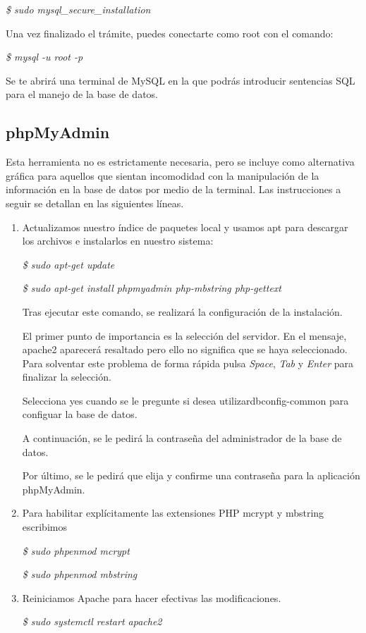 \documentclass[11pt,spanish,
		listoftables,listoffigures]
		{tfgplantilla}
\begin{document}
\textit {\$ sudo mysql\_secure\_installation}

Una vez finalizado el trámite, puedes conectarte como root con el comando:

\textit {\$ mysql -u root -p}

Se te abrirá una terminal de MySQL en la que podrás introducir sentencias SQL para el manejo de la base de datos. 

\subsection {phpMyAdmin}

Esta herramienta no es estrictamente necesaria, pero se incluye como alternativa gráfica para aquellos que sientan incomodidad con la manipulación de la información en la base de datos por medio de la terminal. Las instrucciones a seguir se detallan en las siguientes líneas.

\begin{enumerate}
\item Actualizamos nuestro índice de paquetes local y usamos apt para descargar los archivos e instalarlos en nuestro sistema:

\textit {\$ sudo apt-get update}

\textit {\$ sudo apt-get install phpmyadmin php-mbstring php-gettext}

Tras ejecutar este comando, se realizará la configuración de la instalación.

El primer punto de importancia es la selección del servidor. En el mensaje, apache2 aparecerá resaltado pero ello no significa que se haya seleccionado. Para solventar este problema de forma rápida pulsa \textit {Space}, \textit {Tab} y \textit {Enter} para finalizar la selección.

Selecciona \textquotedbl yes\textquotedbl{} cuando se le pregunte si desea utilizar\textquotedbl dbconfig-common\textquotedbl{} para configuar la base de datos.

A continuación, se le pedirá la contraseña del administrador de la base de datos.

Por último, se le pedirá que elija y confirme una contraseña para la aplicación phpMyAdmin.

\item Para habilitar explícitamente las extensiones PHP \textquotedbl mcrypt\textquotedbl{} y \textquotedbl mbstring\textquotedbl{} escribimos

\textit {\$ sudo phpenmod mcrypt }

\textit {\$ sudo phpenmod mbstring }

\item Reiniciamos Apache para hacer efectivas las modificaciones.

\textit {\$ sudo systemctl restart apache2}

\end{enumerate}
\end{document}
